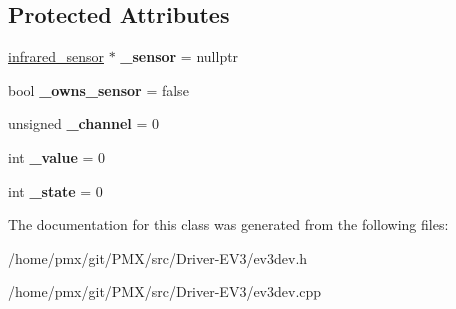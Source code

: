 \subsection*{Protected Attributes}
\begin{DoxyCompactItemize}
\item 
\mbox{\label{classev3dev_1_1remote__control_abe9f275cbc7bcedf3e4fd78684d8ca49}} 
\hyperlink{classev3dev_1_1infrared__sensor}{infrared\+\_\+sensor} $\ast$ {\bfseries \+\_\+sensor} = nullptr
\item 
\mbox{\label{classev3dev_1_1remote__control_a0b147019924235c6aa1080bd1b98b0c8}} 
bool {\bfseries \+\_\+owns\+\_\+sensor} = false
\item 
\mbox{\label{classev3dev_1_1remote__control_a46518f172176aa532482ad814b2a5ca0}} 
unsigned {\bfseries \+\_\+channel} = 0
\item 
\mbox{\label{classev3dev_1_1remote__control_a33a710524fb42247d3e38234a69c75fd}} 
int {\bfseries \+\_\+value} = 0
\item 
\mbox{\label{classev3dev_1_1remote__control_a652bc7ca84144330659b0d16ce15edaa}} 
int {\bfseries \+\_\+state} = 0
\end{DoxyCompactItemize}


The documentation for this class was generated from the following files\+:\begin{DoxyCompactItemize}
\item 
/home/pmx/git/\+P\+M\+X/src/\+Driver-\/\+E\+V3/ev3dev.\+h\item 
/home/pmx/git/\+P\+M\+X/src/\+Driver-\/\+E\+V3/ev3dev.\+cpp\end{DoxyCompactItemize}
